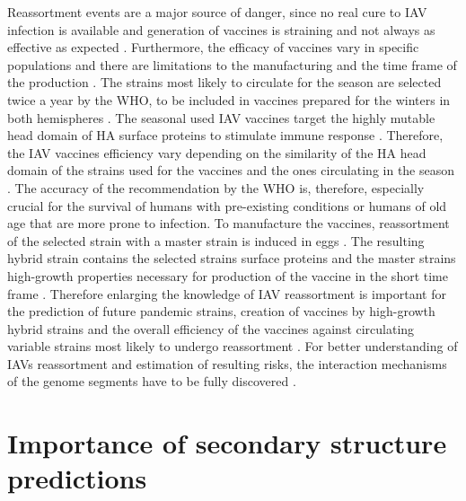 Reassortment events are a major source of danger, since no real cure to \gls{IAV} infection is available and generation of vaccines is straining and not always as effective as expected \autocite{wahlgren_influenza_2011, wong_traditional_2013}. Furthermore, the efficacy of vaccines vary in specific populations and there are limitations to the manufacturing and the time frame of the production \autocite{wong_traditional_2013}. The strains most likely to circulate for the season are selected twice a year by the \gls{WHO}, to be included in vaccines prepared for the winters in both hemispheres \autocite{barr_epidemiological_2010}. The seasonal used \gls{IAV} vaccines target the highly mutable head domain of \gls{HA} surface proteins to stimulate immune response \autocite{wong_traditional_2013, wei_next-generation_2020}. Therefore, the \gls{IAV} vaccines efficiency vary depending on the similarity of the \gls{HA} head domain of the strains used for the vaccines and the ones circulating in the season \autocite{wei_next-generation_2020}. The accuracy of the recommendation by the \gls{WHO} is, therefore, especially crucial for the survival of humans with pre-existing conditions or humans of old age that are more prone to infection. To manufacture the vaccines, reassortment of the selected strain with a master strain is induced in eggs \autocite{wong_traditional_2013}. The resulting hybrid strain contains the selected strains surface proteins and the master strains high-growth properties necessary for production of the vaccine in the short time frame \autocite{wong_traditional_2013}. Therefore enlarging the knowledge of \gls{IAV} reassortment is important for the prediction of future pandemic strains, creation of vaccines by high-growth hybrid strains and the overall efficiency of the vaccines against circulating variable strains most likely to undergo reassortment \autocite{wong_traditional_2013, dadonaite_structure_2019}. For better understanding of \glspl{IAV} reassortment and estimation of resulting risks, the interaction mechanisms of the genome segments have to be fully discovered \autocite{dadonaite_structure_2019}. 

\section{Importance of secondary structure predictions}

